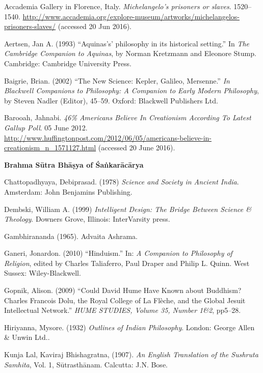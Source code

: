 \begin{thebibliography}{99}
\itemsep=2pt
Accademia Gallery in Florence, Italy. {\sl Michelangelo's prisoners or slaves}. 1520--1540. \url{http://www.accademia.org/explore-museum/artworks/michelangelos-prisoners-slaves/} (accessed 20 Jun 2016).

Aertsen, Jan A. (1993) ``Aquinas's' philosophy in its historical setting.'' In {\sl The Cambridge Companion to Aquinas}, by Norman Kretzmann and Eleonore Stump. Cambridge: Cambridge University Press.

Baigrie, Brian. (2002) ``The New Science: Kepler, Galileo, Mersenne.'' {\sl In Blackwell Companions to Philosophy: A Companion to Early Modern Philosophy}, by Steven Nadler (Editor), 45--59. Oxford: Blackwell Publishers Ltd.

Barooah, Jahnabi. {\sl 46\% Americans Believe In Creationism According To Latest Gallup Poll}. 05 June 2012. \url{http://www.huffingtonpost.com/2012/06/05/americans-believe-in-creationism_n_1571127.html} (accessed 20 June 2016).

{\bf Brahma Sūtra Bhāṣya of Śaṅkarācārya}

Chattopadhyaya, Debiprasad. (1978) {\sl Science and Society in Ancient India}. Amsterdam: John Benjamins Publishing.

Dembski, William A. (1999) {\sl Intelligent Design: The Bridge Between Science \& Theology}. Downers Grove, Illinois: InterVarsity press.

Gambhirananda (1965). Advaita Ashrama.

Ganeri, Jonardon. (2010) ``Hinduism.'' In: {\sl A Companion to Philosophy of Religion}, edited by Charles Taliaferro, Paul Draper and Philip L. Quinn. West Sussex: Wiley-Blackwell.

Gopnik, Alison. (2009) ``Could David Hume Have Known about Buddhism? Charles Francois Dolu, the Royal College of La Flèche, and the Global Jesuit Intellectual Network.'' {\sl HUME STUDIES, Volume 35, Number 1\&2}, pp5--28.

Hiriyanna, Mysore. (1932) {\sl Outlines of Indian Philosophy}. London: George Allen \& Unwin Ltd..

Kunja Lal, Kaviraj Bhishagratna, (1907). {\sl An English Translation of the Sushruta Samhita}, Vol. 1, Sūtrasthānam. Calcutta: J.N. Bose.


\end{thebibliography}
